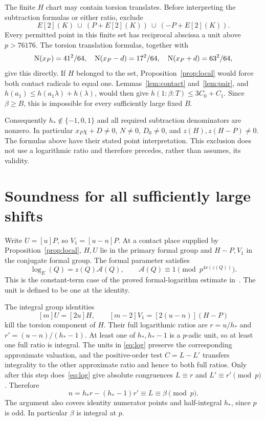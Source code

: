 \documentclass[11pt,a4paper]{article}
\begin{document}
The finite $H$ chart may contain torsion translates. Before interpreting
the subtraction formulas or either ratio, exclude
\[
                  E[2](K)\ \cup\ (P+E[2](K))\ \cup\ (-P+E[2](K)).
\]
Every permitted point in this finite set has reciprocal abscissa a unit
above $p>76176$. The torsion translation formulas, together with
\[
 \operatorname{N}(x_P)=41^2/64,\quad
 \operatorname{N}(x_P-d)=17^2/64,\quad \operatorname{N}(x_P+d)=63^2/64,
\]
give this directly. If $H$ belonged to the set, Proposition~\ref{prop:local}
would force both contact radicals to equal one. Lemmas~\ref{lem:contact}
and~\ref{lem:pair}, and $h(a_1)\le h(a_1\lambda)+h(\lambda)$, would
then give $h(1:\beta:T)\le3C_0+C_1$. Since $\beta\ge B$, this is
impossible for every sufficiently large fixed $B$.

Consequently $h_*\notin\{-1,0,1\}$ and all required subtraction
denominators are nonzero. In particular $x_P\chi+D\ne0$, $N\ne0$,
$D_0\ne0$, and $z(H),z(H-P)\ne0$. The formulas above have their
stated point interpretation. This exclusion does not use a logarithmic
ratio and therefore precedes, rather than assumes, its validity.

\section{Soundness for all sufficiently large shifts}

Write $U=[u]P$, so $V_1=[u-n]P$. At a contact place supplied by
Proposition~\ref{prop:local}, $H,U$ lie in the primary formal group
and $H-P,V_1$ in the conjugate formal group. The formal parameter satisfies
\begin{equation}\label{eq:log}
 \log_E(Q)=z(Q)\mathcal A(Q),\qquad
 \mathcal A(Q)\equiv1\pmod{p^{4v(z(Q))}}.
\end{equation}
This is the constant-term case of the proved formal-logarithm estimate
in~\cite{Logs}. The unit is defined to be one at the identity.

The integral group identities
\[
                [m]U=[2u]H,\qquad
                [m-2]V_1=[2(u-n)](H-P)
\]
kill the torsion component of $H$. Their full logarithmic ratios are
$r=u/h_*$ and $r'=(u-n)/(h_*-1)$. At least one of $h_*,h_*-1$ is a
$p$-adic unit, so at least one full ratio is integral. The units in
\eqref{eq:log} preserve the corresponding approximate valuation, and
the positive-order test $C=L-L'$ transfers integrality to the other
approximate ratio and hence to both full ratios.
Only after this step does~\eqref{eq:log} give absolute congruences
$L\equiv r$ and $L'\equiv r'\pmod p$. Therefore
\[
 n=h_*r-(h_*-1)r'\equiv L\equiv\beta\pmod p.
\]
The argument also covers identity numerator points and half-integral
$h_*$, since $p$ is odd. In particular $\beta$ is integral at $p$.
\end{document}
